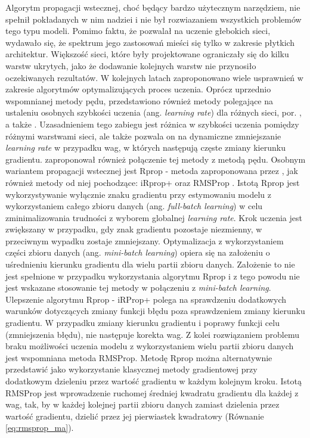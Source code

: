 \documentclass[12pt,a4paper,twoside]{article}
\begin{document}
Algorytm propagacji wstecznej, choć będący bardzo użytecznym narzędziem, nie spełnił pokładanych w nim nadziei i nie był rozwiazaniem wszystkich problemów tego typu modeli. Pomimo faktu, że pozwalał na uczenie głebokich sieci, wydawało się, że spektrum jego zastosowań mieści się tylko w zakresie płytkich architektur. Większość sieci, które były projektowane ograniczały się do kilku warstw ukrytych, jako że dodawanie kolejnych warstw nie przynosiło oczekiwanych rezultatów. W kolejnych latach zaproponowano wiele usprawnień w zakresie algorytmów optymalizujących proces uczenia. Oprócz uprzednio wspomnianej metody pędu, przedstawiono również metody polegające na ustaleniu osobnych szybkości uczenia (ang. \textit{learning rate}) dla różnych sieci, por. \citet{jacobs1989}, a także \citet{almeida1990}. Uzasadnieniem tego zabiegu jest różnica w szybkości uczenia pomiędzy różnymi warstwami sieci, ale także pozwala on na dynamiczne zmniejszanie \textit{learning rate} w przypadku wag, w których następują częste zmiany kierunku gradientu. \citet{jacobs1989} zaproponował również połączenie tej metody z metodą pędu.
Osobnym wariantem propagacji wstecznej jest Rprop - metoda zaproponowana przez \citet{riedmiller1993}, jak również metody od niej pochodzące: iRprop+ \citet{igel2003} oraz RMSProp \citet{tieleman2012}. Istotą Rprop jest wykorzystywanie wyłącznie znaku gradientu przy estymowaniu modelu z wykorzystaniem całego zbioru danych (ang. \textit{full-batch learning}) w celu zminimalizowania trudności z wyborem globalnej \textit{learning rate}. Krok uczenia jest zwiększany w przypadku, gdy znak gradientu pozostaje niezmienny, w przeciwnym wypadku zostaje zmniejszany. Optymalizacja z wykorzystaniem części zbioru danych (ang. \textit{mini-batch learning}) opiera się na założeniu o uśrednieniu kierunku gradientu dla wielu partii zbioru danych. Założenie to nie jest spełnione w przypadku wykorzystania algorytmu Rprop i z tego powodu nie jest wskazane stosowanie tej metody w połączeniu z \textit{mini-batch learning}. Ulepszenie algorytmu Rprop - iRProp+ polega na sprawdzeniu dodatkowych warunków dotyczących zmiany funkcji błędu poza sprawdzeniem zmiany kierunku gradientu. W przypadku zmiany kierunku gradientu i poprawy funkcji celu (zmniejszenia błędu), nie następuje korekta wag. Z kolei rozwiązaniem problemu braku możliwości uczenia modelu z wykorzystaniem wielu partii zbioru danych jest wspomniana metoda RMSProp. Metodę Rprop można alternatywnie przedstawić jako wykorzystanie klasycznej metody gradientowej przy dodatkowym dzieleniu przez wartość gradientu w każdym kolejnym kroku.
Istotą RMSProp jest wprowadzenie ruchomej średniej kwadratu gradientu dla każdej z wag, tak, by w każdej kolejnej partii zbioru danych zamiast dzielenia przez wartość gradientu, dzielić przez jej pierwiastek kwadratowy (Równanie \ref{eq:rmsprop_ma}).
\end{document}
